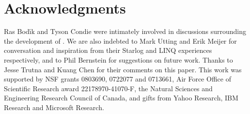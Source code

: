 \section{Acknowledgments}
Ras Bod\'{\i}k and Tyson Condie were intimately involved in discussions
surrounding the development of \lang.  We are also indebted to Mark Utting and
Erik Meijer for conversation and inspiration from their Starlog and LINQ
experiences respectively, and to Phil Bernstein for suggestions on future work.
Thanks to Jesse Trutna and Kuang Chen for their comments on this paper. This
work was supported by NSF grants 0803690, 0722077 and 0713661, Air Force Office
of Scientific Research award 22178970-41070-F, the Natural Sciences and
Engineering Research Council of Canada, and gifts from Yahoo Research, IBM
Research and Microsoft Research.
